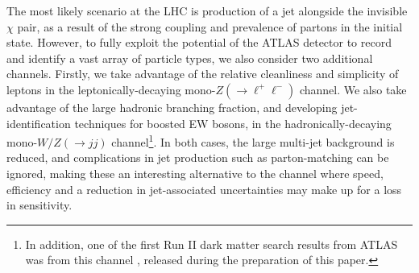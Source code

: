 The most likely scenario at the LHC is production of a jet alongside the invisible $\chi$ pair, as a result of the strong coupling and prevalence of partons in the initial state. However, to fully exploit the potential of the ATLAS detector to record and identify a vast array of particle types, we also consider two additional channels. Firstly, we take advantage of the relative cleanliness and simplicity of leptons in the leptonically-decaying mono-$Z(\rightarrow \ell^+ \ell^-)$ channel. We also take advantage of the large hadronic branching fraction, and developing jet-identification techniques for boosted EW bosons, in the hadronically-decaying mono-$W/Z(\rightarrow jj)$ channel\footnote{In addition, one of the first Run II dark matter search results from ATLAS was from this channel \cite{monoWZ_run2}, released during the preparation of this paper.}. In both cases, the large multi-jet background is reduced, and complications in jet production such as parton-matching can be ignored, making these an interesting alternative to the \monojet channel where speed, efficiency and a reduction in jet-associated uncertainties may make up for a loss in sensitivity.


